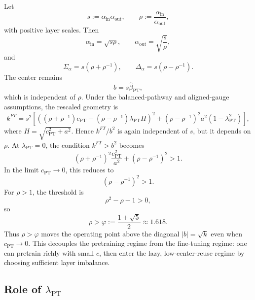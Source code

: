 \documentclass[11pt]{article}
\begin{document}
Let
\begin{equation}
    s:=\alpha_{\mathrm{in}}\alpha_{\mathrm{out}},
    \qquad
    \rho:=\frac{\alpha_{\mathrm{in}}}{\alpha_{\mathrm{out}}},
\end{equation}
with positive layer scales. Then
\begin{equation}
    \alpha_{\mathrm{in}}=\sqrt{s\rho},
    \qquad
    \alpha_{\mathrm{out}}=\sqrt{\frac{s}{\rho}},
\end{equation}
and
\begin{equation}
    \Sigma_\alpha=s(\rho+\rho^{-1}),
    \qquad
    \Delta_\alpha=s(\rho-\rho^{-1}).
\end{equation}
The center remains
\begin{equation}
    b=s\widehat\beta_{\mathrm{PT}},
\end{equation}
which is independent of \(\rho\). Under the balanced-pathway and aligned-gauge assumptions, the rescaled geometry is
\begin{equation}
    k^{FT}
    =
    s^2\left[
    \left((\rho+\rho^{-1})c_{\mathrm{PT}}
    +
    (\rho-\rho^{-1})\lambda_{\mathrm{PT}}H\right)^2
    +
    (\rho-\rho^{-1})^2a^2(1-\lambda_{\mathrm{PT}}^2)
    \right],
\end{equation}
where \(H=\sqrt{c_{\mathrm{PT}}^2+a^2}\). Hence \(k^{FT}/b^2\) is again independent of \(s\), but it depends on \(\rho\). At \(\lambda_{\mathrm{PT}}=0\), the condition \(k^{FT}>b^2\) becomes
\begin{equation}
    (\rho+\rho^{-1})^2\frac{c_{\mathrm{PT}}^2}{a^2}
    +
    (\rho-\rho^{-1})^2
    >1.
\end{equation}
In the limit \(c_{\mathrm{PT}}\to0\), this reduces to
\begin{equation}
    (\rho-\rho^{-1})^2>1.
\end{equation}
For \(\rho>1\), the threshold is
\begin{equation}
    \rho^2-\rho-1>0,
\end{equation}
so
\begin{equation}
    \boxed{\rho>\varphi:=\frac{1+\sqrt5}{2}\approx1.618.}
\end{equation}
Thus \(\rho>\varphi\) moves the operating point above the diagonal \(|b|=\sqrt{k}\) even when \(c_{\mathrm{PT}}\to0\). This decouples the pretraining regime from the fine-tuning regime: one can pretrain richly with small \(c\), then enter the lazy, low-center-reuse regime by choosing sufficient layer imbalance.

\subsection{Role of \texorpdfstring{\(\lambda_{\mathrm{PT}}\)}{lambdaPT}}
\end{document}
